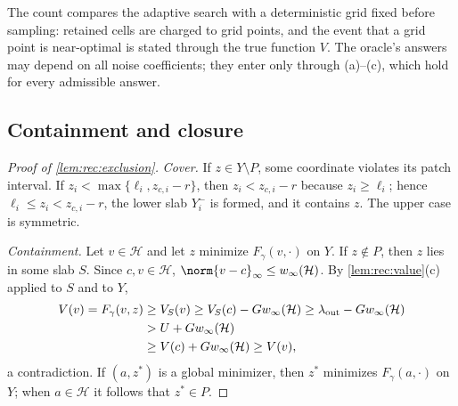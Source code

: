 The count compares the adaptive search with a deterministic grid fixed before
sampling: retained cells are charged to grid points, and the event that a grid
point is near-optimal is stated through the true function $V$. The oracle's
answers may depend on all noise coefficients; they enter only through
(a)--(c), which hold for every admissible answer.

\subsection{Containment and closure}\label{app:rec:certificates}

\begin{proof}[Proof of \cref{lem:rec:exclusion}]
\emph{Cover.} If $z\in Y\setminus P$, some coordinate violates its patch
interval. If $z_i<\max\{\ell_i,z_{c,i}-r\}$, then $z_i<z_{c,i}-r$ because
$z_i\ge\ell_i$; hence $\ell_i\le z_i<z_{c,i}-r$, the lower slab $Y_i^-$ is
formed, and it contains $z$. The upper case is symmetric.

\emph{Containment.} Let $v\in\mathcal H$ and let $z$ minimize
$F_\gamma(v,\cdot)$ on $Y$. If $z\notin P$, then $z$ lies in some slab $S$.
Since $c,v\in\mathcal H$, $\norm{v-c}_\infty\le w_\infty(\mathcal H)$. By
\cref{lem:rec:value}(c) applied to $S$ and to $Y$,
\begin{align*}
 V(v)=F_\gamma(v,z)&\ge V_S(v)\ge V_S(c)-Gw_\infty(\mathcal H)
 \ge\lambda_{\rm out}-Gw_\infty(\mathcal H)\\
 &>U+Gw_\infty(\mathcal H)\\
 &\ge V(c)+Gw_\infty(\mathcal H)\ge V(v),
\end{align*}
a contradiction. If $(a,z^*)$ is a global minimizer, then $z^*$ minimizes
$F_\gamma(a,\cdot)$ on $Y$; when $a\in\mathcal H$ it follows that $z^*\in P$.
\end{proof}

